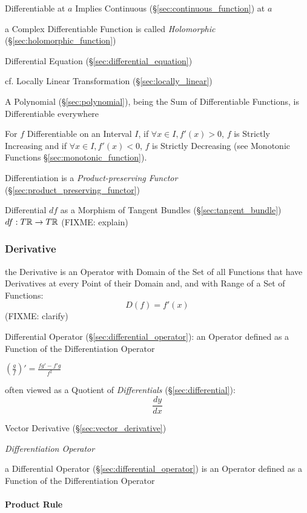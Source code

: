 Differentiable at $a$ Implies Continuous (\S\ref{sec:continuous_function}) at
$a$

a Complex Differentiable Function is called \emph{Holomorphic}
(\S\ref{sec:holomorphic_function})

\fist Differential Equation (\S\ref{sec:differential_equation})

\fist cf. Locally Linear Transformation (\S\ref{sec:locally_linear})

A Polynomial (\S\ref{sec:polynomial}), being the Sum of Differentiable
Functions, is Differentiable everywhere

For $f$ Differentiable on an Interval $I$, if $\forall x \in I, f'(x)
> 0$, $f$ is Strictly Increasing and if $\forall x \in I, f'(x) < 0$,
$f$ is Strictly Decreasing (see Monotonic Functions
\S\ref{sec:monotonic_function}).

Differentiation is a \emph{Product-preserving Functor}
(\S\ref{sec:product_preserving_functor})

Differential $df$ as a Morphism of Tangent Bundles (\S\ref{sec:tangent_bundle})
$df : T\mathbb{R} \rightarrow T\mathbb{R}$ (FIXME: explain)



\subsubsection{Derivative}\label{sec:derivative}

the Derivative is an Operator with Domain of the Set of all Functions that have
Derivatives at every Point of their Domain and, and with Range of a Set of
Functions:
\[
  D(f) = f'(x)
\]
(FIXME: clarify)

\fist Differential Operator (\S\ref{sec:differential_operator}): an Operator
defined as a Function of the Differentiation Operator


$(\frac{g}{f})' = \frac{f g' - f' g}{f^2}$

often viewed as a Quotient of \emph{Differentials} (\S\ref{sec:differential}):
\[
  \frac{dy}{dx}
\]

\fist Vector Derivative (\S\ref{sec:vector_derivative})

\emph{Differentiation Operator}

a Differential Operator (\S\ref{sec:differential_operator}) is an Operator
defined as a Function of the Differentiation Operator



\paragraph{Product Rule}\label{sec:product_rule}\hfill


